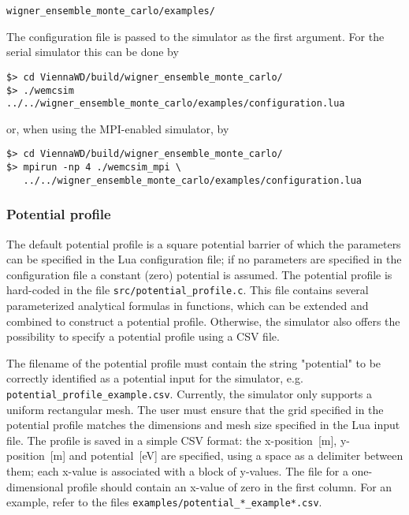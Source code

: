 \begin{lstlisting}
wigner_ensemble_monte_carlo/examples/
\end{lstlisting}

The configuration file is passed to the simulator as the first argument. For the serial simulator this can be done by

\begin{lstlisting}
$> cd ViennaWD/build/wigner_ensemble_monte_carlo/
$> ./wemcsim ../../wigner_ensemble_monte_carlo/examples/configuration.lua
\end{lstlisting}

or, when using the MPI-enabled simulator, by

\begin{lstlisting}
$> cd ViennaWD/build/wigner_ensemble_monte_carlo/
$> mpirun -np 4 ./wemcsim_mpi \
   ../../wigner_ensemble_monte_carlo/examples/configuration.lua
\end{lstlisting}

\subsubsection{Potential profile}

The default potential profile is a square potential barrier of which the parameters can be specified in the Lua configuration file; if no parameters are specified in the configuration file a constant (zero) potential is assumed. The potential profile is hard-coded in the file \linebreak \texttt{src/potential\_profile.c}. This file contains several parameterized analytical formulas in functions, which can be extended and combined to construct a potential profile. Otherwise, the simulator also offers the possibility to specify a potential profile using a CSV file.

The filename of the potential profile must contain the string "potential" to be correctly identified as a potential input for the simulator, e.g. \texttt{potential\_profile\_example.csv}. Currently, the simulator only supports a uniform rectangular mesh. The user must ensure that the grid specified in the potential profile matches the dimensions and mesh size specified in the Lua input file. The profile is saved in a simple CSV format: the x-position~[m], y-position~[m] and potential~[eV] are specified, using a space as a delimiter between them; each x-value is associated with a block of y-values. The file for a one-dimensional profile should contain an x-value of zero in the first column. For an example, refer to the files \texttt{examples/potential\_*\_example*.csv}. 

